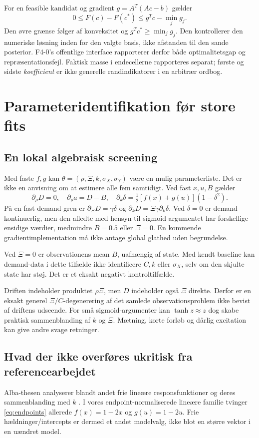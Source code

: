 For en feasible kandidat og gradient \(g=A^T(Ac-b)\) gælder
\begin{equation}
 0\leq F(c)-F(c^*)\leq g^Tc-\min_jg_j.
 \label{eq:gap}
\end{equation}
Den øvre grænse følger af konveksitet og \(g^Tc^*\geq\min_jg_j\). Den kontrollerer den numeriske løsning inden for den valgte basis, ikke afstanden til den sande posterior. F4-0's offentlige interface rapporterer derfor både optimalitetsgap og repræsentationsfejl. Faktisk masse i endecellerne rapporteres separat; første og sidste \emph{koefficient} er ikke generelle randindikatorer i en arbitrær ordbog.


\section{Parameteridentifikation før store fits}
\subsection{En lokal algebraisk screening}
Med faste \(f,g\) kan \(\theta=(\rho,\Xi,k,\sigma_X,\sigma_Y)\) være en mulig parameterliste. Det er ikke en anvisning om at estimere alle fem samtidigt. Ved fast \(x,u,B\) gælder
\[
 \partial_\rho D=0,\quad \partial_\rho a=D-B,\quad
 \partial_k\delta=\tfrac12[f(x)+g(u)](1-\delta^2).
\]
På en fast demand-gren er \(\partial_\Xi D=\gamma\delta\) og \(\partial_kD=\Xi\gamma\partial_k\delta\). Ved \(\delta=0\) er demand kontinuerlig, men den afledte med hensyn til sigmoid-argumentet har forskellige ensidige værdier, medmindre \(B=0.5\) eller \(\Xi=0\). En kommende gradientimplementation må ikke antage global glathed uden begrundelse.

Ved \(\Xi=0\) er observationens mean \(B\), uafhængig af state. Med kendt baseline kan demand-data i dette tilfælde ikke identificere \(C,k\) eller \(\sigma_X\), selv om den skjulte state har støj. Det er et eksakt negativt kontroltilfælde.

Driften indeholder produktet \(\rho\Xi\), men \(D\) indeholder også \(\Xi\) direkte. Derfor er en eksakt generel \(\Xi/C\)-degenerering af det samlede observationsproblem ikke bevist af driftens udseende. For små sigmoid-argumenter kan \(\tanh z\approx z\) dog skabe praktisk sammenblanding af \(k\) og \(\Xi\). Mætning, korte forløb og dårlig excitation kan give andre svage retninger.

\subsection{Hvad der ikke overføres ukritisk fra referencearbejdet}
Alba-thesen analyserer blandt andet frie lineære responsfunktioner og deres sammenblanding med \(k\) \cite{alba}. I vores endpoint-normaliserede lineære familie tvinger \eqref{eq:endpoints} allerede \(f(x)=1-2x\) og \(g(u)=1-2u\). Frie hældninger/intercepts er dermed et andet modelvalg, ikke blot en større vektor i en uændret model.

